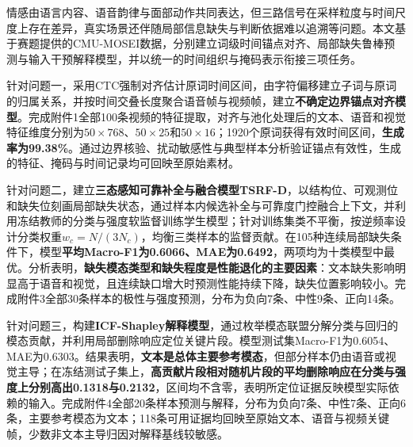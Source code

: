 情感由语言内容、语音韵律与面部动作共同表达，但三路信号在采样粒度与时间尺度上存在差异，真实场景还伴随局部信息缺失与判断依据难以追溯等问题。本文基于赛题提供的CMU-MOSEI数据，分别建立词级时间锚点对齐、局部缺失鲁棒预测与输入干预解释模型，并以统一的时间组织与掩码表示衔接三项任务。

针对问题一，采用CTC强制对齐估计原词时间区间，由字符偏移建立子词与原词的归属关系，并按时间交叠长度聚合语音帧与视频帧，建立\textbf{不确定边界锚点对齐模型}。完成附件1全部100条视频的特征提取，对齐与池化处理后的文本、语音和视觉特征维度分别为$50\times768$、$50\times25$和$50\times16$；1920个原词获得有效时间区间，\textbf{生成率为99.38\%}。通过边界核验、扰动敏感性与典型样本分析验证锚点有效性，生成的特征、掩码与时间记录均可回映至原始素材。

针对问题二，建立\textbf{三态感知可靠补全与融合模型TSRF-D}，以结构位、可观测位和缺失位刻画局部缺失状态，通过样本内候选补全与可靠度门控融合上下文，并利用冻结教师的分类与强度软监督训练学生模型；针对训练集类不平衡，按逆频率设计分类权重$w_c=N/(3N_c)$，均衡三类样本的监督贡献。在105种连续局部缺失条件下，模型\textbf{平均Macro-F1为0.6066、MAE为0.6492}，两项均为十类模型中最优。分析表明，\textbf{缺失模态类型和缺失程度是性能退化的主要因素}：文本缺失影响明显高于语音和视觉，且连续缺口增大时预测性能持续下降，缺失位置影响较小。完成附件3全部30条样本的极性与强度预测，分布为负向7条、中性9条、正向14条。

针对问题三，构建\textbf{ICF-Shapley解释模型}，通过枚举模态联盟分解分类与回归的模态贡献，并利用局部删除响应定位关键片段。模型测试集Macro-F1为0.6054、MAE为0.6303。结果表明，\textbf{文本是总体主要参考模态}，但部分样本仍由语音或视觉主导；在冻结测试子集上，\textbf{高贡献片段相对随机片段的平均删除响应在分类与强度上分别高出0.1318与0.2132}，区间均不含零，表明所定位证据反映模型实际依赖的输入。完成附件4全部20条样本预测与解释，分布为负向7条、中性7条、正向6条，主要参考模态为文本；118条可用证据均回映至原始文本、语音与视频关键帧，少数非文本主导归因对解释基线较敏感。

